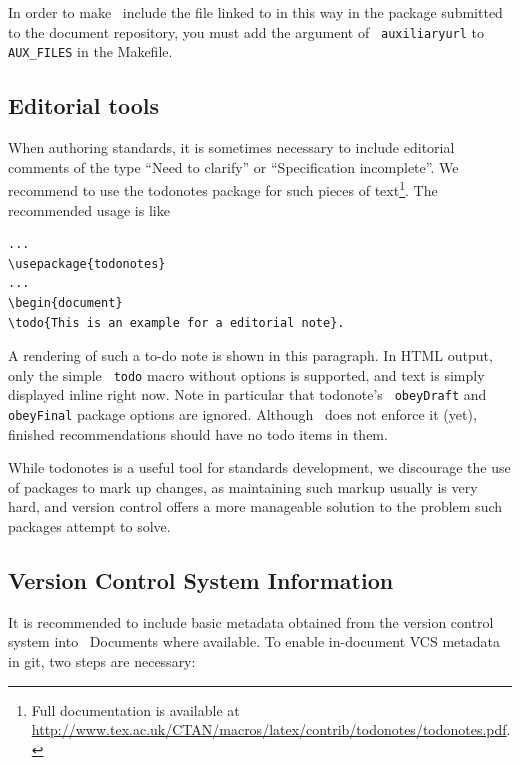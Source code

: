 \documentclass[11pt,a4paper]{ivoa}
\newcommand{\texword}[1]{\texttt{\color{texcolor} #1}}
\begin{document}
In order to make \ivoatex~include the file linked to in this way in the
package submitted to the document repository, you must add the argument
of \texword{auxiliaryurl} to \verb|AUX_FILES| in the Makefile.

\subsection{Editorial tools}

When authoring standards, it is sometimes necessary to include
editorial comments of the type ``Need to clarify'' or ``Specification
incomplete''.  We recommend to use the todonotes package for such
pieces of text\footnote{Full documentation is available at
\url{http://www.tex.ac.uk/CTAN/macros/latex/contrib/todonotes/todonotes.pdf}.}.
The recommended usage is like
\begin{lstlisting}
...
\usepackage{todonotes}
...
\begin{document}
\todo{This is an example for a editorial note}.
\end{lstlisting}

A rendering of such a to-do note is shown in this 
paragraph. In HTML output,
only the simple \texword{todo} macro without options is supported, and
text is simply displayed inline right now.  Note in particular that
todonote's \texword{obeyDraft} and \texword{obeyFinal} package options
are ignored.  Although \ivoatex\ does not enforce it (yet), finished
recommendations should have no todo items in them.

While todonotes is a useful tool for standards development, we
discourage the use of packages to mark up changes, as maintaining such
markup usually is very hard, and version control offers a more
manageable solution to the problem such packages attempt to solve.

\subsection{Version Control System Information}
\label{sect:vcs}

It is recommended to include basic metadata obtained from the version
control system into \ivoatex~Documents where available.  
To enable in-document VCS metadata in git, two steps are necessary:

\end{document}
